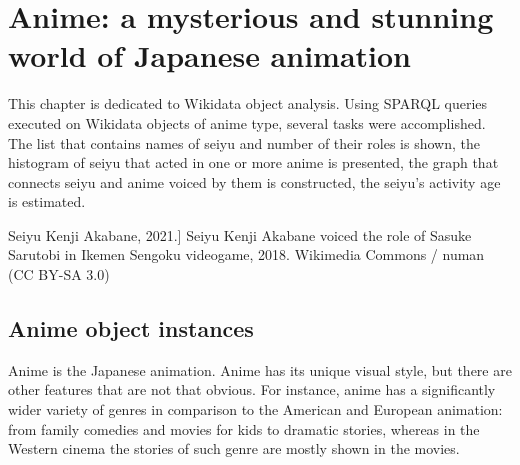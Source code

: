 
\chapter{Anime: a mysterious and stunning world of Japanese animation\protect\footnotemark}




This chapter is dedicated to  Wikidata object analysis. Using SPARQL queries executed on Wikidata objects of anime type, several tasks were accomplished. The list that contains names of seiyu and number of their roles is shown, the histogram of seiyu that acted in one or more anime is presented, the graph that connects seiyu and anime voiced by them is constructed, the seiyu's activity age is estimated.

\begin{marginfigure}[0.0cm]
{
	\setlength{\fboxsep}{0pt}%
	\setlength{\fboxrule}{1pt}%
}
\caption
[Seiyu Kenji Akabane, 2021.]
{
Seiyu Kenji Akabane voiced the role of Sasuke Sarutobi in Ikemen Sengoku videogame, 2018.\newline
Wikimedia Commons / numan (CC BY-SA 3.0)
}
\label{fig:seiyu}
\end{marginfigure}

\section{Anime object instances}

Anime is the Japanese animation. Anime has its unique visual style, but there are other features that are not that obvious. For instance, anime has a significantly wider variety of genres in comparison to the American and European animation: from family comedies and movies for kids to dramatic stories, whereas in the Western cinema the stories of such genre are mostly shown in the movies.

